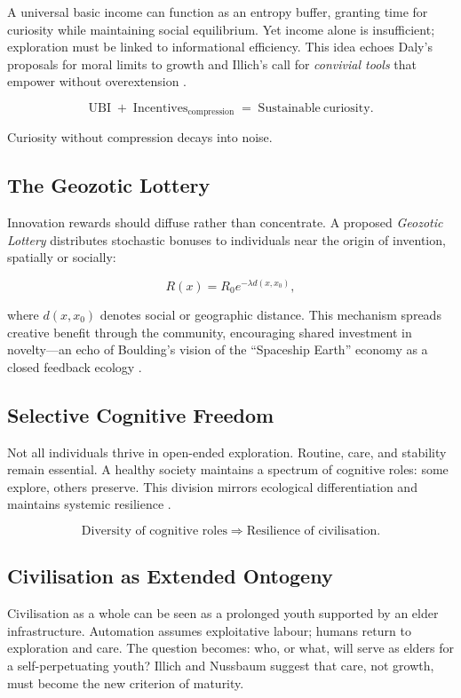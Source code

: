 \documentclass[12pt,a4paper]{article}
\begin{document}
A universal basic income can function as an entropy buffer, 
granting time for curiosity while maintaining social equilibrium.  
Yet income alone is insufficient; exploration must be linked to informational efficiency.
This idea echoes Daly’s proposals for moral limits to growth 
\citep{daly1977steady,daly2020rethinking} 
and Illich’s call for \emph{convivial tools} that empower without overextension 
\citep{illich1973tools}.

\[
\mathrm{UBI}
\;+\;
\mathrm{Incentives}_{\mathrm{compression}}
\;=\;
\mathrm{Sustainable\ curiosity.}
\]

Curiosity without compression decays into noise.

\subsection{The Geozotic Lottery}

Innovation rewards should diffuse rather than concentrate.  
A proposed \textit{Geozotic Lottery} distributes stochastic bonuses 
to individuals near the origin of invention, spatially or socially:

\[
R(x) = R_0 e^{-\lambda d(x,x_0)},
\]

where \(d(x,x_0)\) denotes social or geographic distance.  
This mechanism spreads creative benefit through the community, 
encouraging shared investment in novelty---an echo of Boulding’s vision 
of the ``Spaceship Earth'' economy as a closed feedback ecology 
\citep{boulding1966spaceship}.

\subsection{Selective Cognitive Freedom}

Not all individuals thrive in open-ended exploration.  
Routine, care, and stability remain essential.  
A healthy society maintains a spectrum of cognitive roles:
some explore, others preserve.  
This division mirrors ecological differentiation 
and maintains systemic resilience \citep{capra2021systems,dalziel2022thermodynamics}.

\[
\text{Diversity of cognitive roles}
\;\Rightarrow\;
\text{Resilience of civilisation.}
\]

\subsection{Civilisation as Extended Ontogeny}

Civilisation as a whole can be seen as a prolonged youth supported by an elder infrastructure.
Automation assumes exploitative labour; humans return to exploration and care.
The question becomes: who, or what, will serve as elders for a self-perpetuating youth?
Illich \citep{illich1973tools} and Nussbaum \citep{nussbaum2019capabilities}
suggest that care, not growth, must become the new criterion of maturity.
\end{document}

